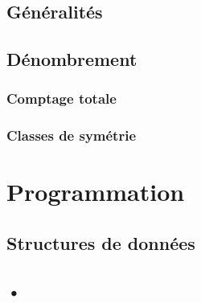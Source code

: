 \documentclass[10pt,a4paper]{article}
\begin{document}
	\subsection{Généralités}
	\subsection{Dénombrement}
		\subsubsection{Comptage totale}
		\subsubsection{Classes de symétrie}

\section{Programmation}
	\subsection{Structures de données}
	\subsection{•}
\end{document}
